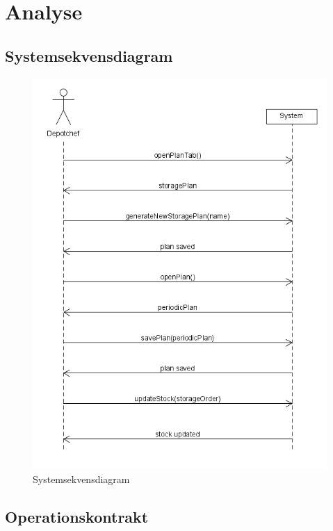 \chapter{Analyse}\label{sec:analyse}

\section{Systemsekvensdiagram}
\begin{figure}
    \centering
    \includegraphics[width=\textwidth]{figures/analyse/SSD.png}
    \caption{Systemsekvensdiagram}
    \label{fig:ssd}
\end{figure}


\section{Operationskontrakt}

